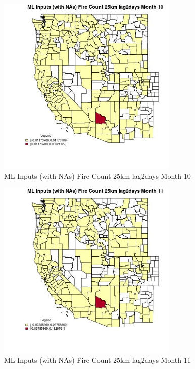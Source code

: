\begin{figure} 
\centering  
\includegraphics[width=0.77\textwidth]{Code_Outputs/Report_ML_input_PM25_Step4_part_e_de_duplicated_aves_compiled_2019-05-21wNAs_CountyFire_Count_25km_lag2daysmedianMonth10.jpg} 
\caption{\label{fig:Report_ML_input_PM25_Step4_part_e_de_duplicated_aves_compiled_2019-05-21wNAsCountyFire_Count_25km_lag2daysmedianMonth10}ML Inputs (with NAs) Fire Count 25km lag2days Month 10} 
\end{figure} 
 

\begin{figure} 
\centering  
\includegraphics[width=0.77\textwidth]{Code_Outputs/Report_ML_input_PM25_Step4_part_e_de_duplicated_aves_compiled_2019-05-21wNAs_CountyFire_Count_25km_lag2daysmedianMonth11.jpg} 
\caption{\label{fig:Report_ML_input_PM25_Step4_part_e_de_duplicated_aves_compiled_2019-05-21wNAsCountyFire_Count_25km_lag2daysmedianMonth11}ML Inputs (with NAs) Fire Count 25km lag2days Month 11} 
\end{figure} 
 

